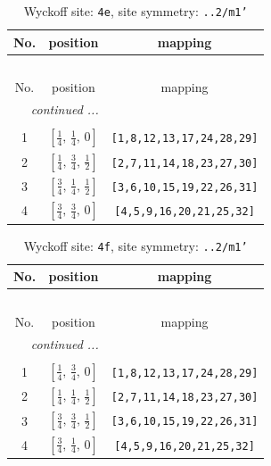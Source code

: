 \documentclass[fleqn,8pt]{jsarticle}
\begin{document}
\renewcommand{\arraystretch}{1.2}
\begin{longtable}{ccc}
\caption{Wyckoff site: {\tt 4e}, site symmetry: {\tt ..2/m1'}}
 \\
 \hline \hline
No. & position & mapping \\ \hline \endfirsthead

\multicolumn{2}{l}{\tablename\ \thetable{}} \\
 \hline \hline
No. & position & mapping \\ \hline \endhead

 \hline \hline
\multicolumn{2}{r}{\footnotesize\it continued ...} \\ \endfoot

 \hline \hline
\multicolumn{2}{r}{} \\ \endlastfoot

1 & $\left[ \frac{1}{4},\, \frac{1}{4},\, 0 \right]$ & {\tt [1,8,12,13,17,24,28,29]} \\ \hline
2 & $\left[ \frac{1}{4},\, \frac{3}{4},\, \frac{1}{2} \right]$ & {\tt [2,7,11,14,18,23,27,30]} \\ \hline
3 & $\left[ \frac{3}{4},\, \frac{1}{4},\, \frac{1}{2} \right]$ & {\tt [3,6,10,15,19,22,26,31]} \\ \hline
4 & $\left[ \frac{3}{4},\, \frac{3}{4},\, 0 \right]$ & {\tt [4,5,9,16,20,21,25,32]} \\
\end{longtable}
\renewcommand{\arraystretch}{1.2}
\begin{longtable}{ccc}
\caption{Wyckoff site: {\tt 4f}, site symmetry: {\tt ..2/m1'}}
 \\
 \hline \hline
No. & position & mapping \\ \hline \endfirsthead

\multicolumn{2}{l}{\tablename\ \thetable{}} \\
 \hline \hline
No. & position & mapping \\ \hline \endhead

 \hline \hline
\multicolumn{2}{r}{\footnotesize\it continued ...} \\ \endfoot

 \hline \hline
\multicolumn{2}{r}{} \\ \endlastfoot

1 & $\left[ \frac{1}{4},\, \frac{3}{4},\, 0 \right]$ & {\tt [1,8,12,13,17,24,28,29]} \\ \hline
2 & $\left[ \frac{1}{4},\, \frac{1}{4},\, \frac{1}{2} \right]$ & {\tt [2,7,11,14,18,23,27,30]} \\ \hline
3 & $\left[ \frac{3}{4},\, \frac{3}{4},\, \frac{1}{2} \right]$ & {\tt [3,6,10,15,19,22,26,31]} \\ \hline
4 & $\left[ \frac{3}{4},\, \frac{1}{4},\, 0 \right]$ & {\tt [4,5,9,16,20,21,25,32]} \\
\end{longtable}
\end{document}
